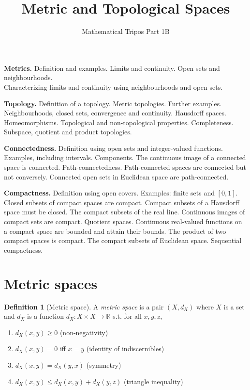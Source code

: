 \documentclass[a4paper,11pt]{article}
\title{Metric and Topological Spaces}
\author{Mathematical Tripos Part 1B}
\affiliation{University of Cambridge}
\theoremstyle{definition}
\newtheorem*{defn}{Definition}
\numberwithin{equation}{section}
\begin{document}
\maketitle
\flushbottom
\clearpage

\hrulefill

\textbf{Metrics.}
Definition and examples. Limits and continuity. Open sets and neighbourhoods.\\
Characterizing limits and continuity using neighbourhoods and open sets.

\textbf{Topology.}
Definition of a topology. Metric topologies. Further examples. Neighbourhoods, closed sets, convergence and continuity. Hausdorff spaces. Homeomorphisms. Topological and non-topological properties. Completeness. Subspace, quotient and product topologies.

\textbf{Connectedness.}
Definition using open sets and integer-valued functions. Examples, including intervals. Components. The continuous image of a connected space is connected. Path-connectedness. Path-connected spaces are connected but not conversely. Connected open sets in Euclidean space are path-connected.

\textbf{Compactness.}
Definition using open covers. Examples: finite sets and $[0, 1]$. Closed subsets of compact spaces are compact. Compact subsets of a Hausdorff space must be closed. The compact subsets of the real line. Continuous images of compact sets are compact. Quotient spaces. Continuous real-valued functions on a compact space are bounded and attain their bounds. The product of two compact spaces is compact. The compact subsets of Euclidean space. Sequential compactness.

\hrulefill
\clearpage

\section{Metric spaces}

\begin{defn}[Metric space]
A \emph{metric space} is a pair $(X, d_X)$ where $X$ is a set and $d_X$ is a function $d_X: X\times X\rightarrow\mathbb{R}$ s.t. for all $x,y,z$, 
\begin{enumerate}
    \item $d_X(x,y)\geq0$ (non-negativity)
    \item $d_X(x,y)=0$ iff $x=y$ (identity of indiscernibles)
    \item $d_X(x,y)=d_X(y,x)$ (symmetry)
    \item $d_X(x,y)\leq d_X(x,y)+d_X(y,z)$ (triangle inequality)
\end{enumerate}
\end{defn}
\end{document}
